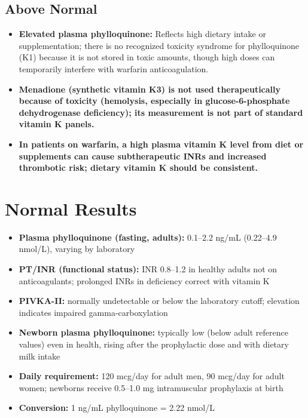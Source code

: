 \subsection*{Above Normal}
\begin{itemize}
  \item \textbf{Elevated plasma phylloquinone:} Reflects high dietary intake or supplementation; there is no recognized toxicity syndrome for phylloquinone (K1) because it is not stored in toxic amounts, though high doses can temporarily interfere with warfarin anticoagulation.
  \item \textbf{Menadione (synthetic vitamin K3) is not used therapeutically because of toxicity (hemolysis, especially in glucose-6-phosphate dehydrogenase deficiency); its measurement is not part of standard vitamin K panels.}
  \item \textbf{In patients on warfarin, a high plasma vitamin K level from diet or supplements can cause subtherapeutic INRs and increased thrombotic risk; dietary vitamin K should be consistent.}
\end{itemize}

\section*{Normal Results}
\begin{itemize}
  \item \textbf{Plasma phylloquinone (fasting, adults):} 0.1--2.2 ng/mL (0.22--4.9 nmol/L), varying by laboratory
  \item \textbf{PT/INR (functional status):} INR 0.8--1.2 in healthy adults not on anticoagulants; prolonged INRs in deficiency correct with vitamin K
  \item \textbf{PIVKA-II:} normally undetectable or below the laboratory cutoff; elevation indicates impaired gamma-carboxylation
  \item \textbf{Newborn plasma phylloquinone:} typically low (below adult reference values) even in health, rising after the prophylactic dose and with dietary milk intake
  \item \textbf{Daily requirement:} 120 mcg/day for adult men, 90 mcg/day for adult women; newborns receive 0.5--1.0 mg intramuscular prophylaxis at birth
  \item \textbf{Conversion:} 1 ng/mL phylloquinone = 2.22 nmol/L
\end{itemize}

